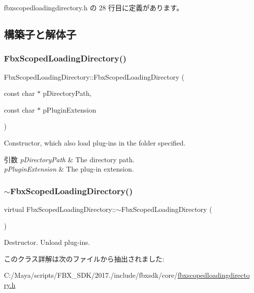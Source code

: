  fbxscopedloadingdirectory.\+h の 28 行目に定義があります。



\subsection{構築子と解体子}
\mbox{\label{class_fbx_scoped_loading_directory_a9679c872ae08e0a76f9b63a7dc899985}} 
\subsubsection{\texorpdfstring{Fbx\+Scoped\+Loading\+Directory()}{FbxScopedLoadingDirectory()}}
{\footnotesize\ttfamily Fbx\+Scoped\+Loading\+Directory\+::\+Fbx\+Scoped\+Loading\+Directory (\begin{DoxyParamCaption}\item[{const char $\ast$}]{p\+Directory\+Path,  }\item[{const char $\ast$}]{p\+Plugin\+Extension }\end{DoxyParamCaption})}

Constructor, which also load plug-\/ins in the folder specified. 
\begin{DoxyParams}{引数}
{\em p\+Directory\+Path} & The directory path. \\
\hline
{\em p\+Plugin\+Extension} & The plug-\/in extension. \\
\hline
\end{DoxyParams}
\mbox{\label{class_fbx_scoped_loading_directory_ae8a3e3331bf58edef910021442af358b}} 
\subsubsection{\texorpdfstring{$\sim$\+Fbx\+Scoped\+Loading\+Directory()}{~FbxScopedLoadingDirectory()}}
{\footnotesize\ttfamily virtual Fbx\+Scoped\+Loading\+Directory\+::$\sim$\+Fbx\+Scoped\+Loading\+Directory (\begin{DoxyParamCaption}{ }\end{DoxyParamCaption})\hspace{0.3cm}{\ttfamily [virtual]}}

Destructor. Unload plug-\/ins. 

このクラス詳解は次のファイルから抽出されました\+:\begin{DoxyCompactItemize}
\item 
C\+:/\+Maya/scripts/\+F\+B\+X\+\_\+\+S\+D\+K/2017./include/fbxsdk/core/\hyperlink{fbxscopedloadingdirectory_8h}{fbxscopedloadingdirectory.\+h}\end{DoxyCompactItemize}
